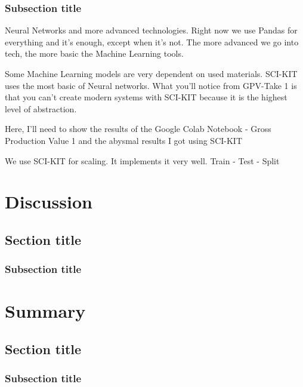 \documentclass[
]{thesis-ekf}
\begin{document}
\subsection{Subsection title}
Neural Networks and more advanced technologies. Right now we use Pandas for everything and it's enough, except when it's not. The more advanced we go into tech, the more basic the Machine Learning tools.

Some Machine Learning models are very dependent on used materials. SCI-KIT uses the most basic of Neural networks. What you'll notice from GPV-Take 1 is that you can't create modern systems with SCI-KIT because it is the highest level of abstraction.

Here, I'll need to show the results of the Google Colab Notebook - Gross Production Value 1 and the abysmal results I got using SCI-KIT

We use SCI-KIT for scaling. It implements it very well. Train - Test - Split
\cite{ponce1989engineering}


\chapter{Discussion}
\section{Section title}
\subsection{Subsection title}


\chapter{Summary}
\section{Section title}
\subsection{Subsection title}







\end{document}
